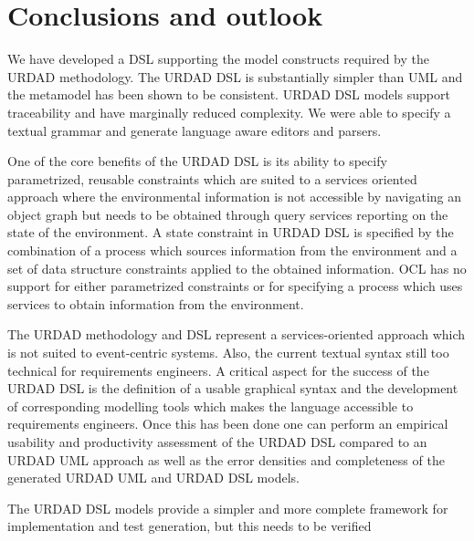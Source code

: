 \section{Conclusions and outlook \label{sec:conclusionsAndOutlook}}

We have developed a DSL supporting the model constructs required by the URDAD methodology. The URDAD DSL is substantially simpler than UML and the metamodel has been shown to be consistent. URDAD DSL models support traceability and have marginally reduced complexity. We were able to specify a textual grammar and generate language aware editors and parsers. 

One of the core benefits of the URDAD DSL is its ability to specify parametrized, reusable constraints which are suited to a services oriented approach where the environmental information is not accessible by navigating an object graph but needs to be obtained through query services reporting on the state of the environment. A state constraint in URDAD DSL is specified by the combination of a process which sources information from the environment and a set of data structure constraints applied to the obtained information. OCL has no support for either parametrized constraints or for specifying a process which uses services to obtain information from the environment.

The URDAD methodology and DSL represent a services-oriented approach which is not suited to event-centric systems. Also, the current textual syntax still too technical for requirements engineers. A critical aspect for the success of the URDAD DSL is the definition of a usable graphical syntax and the development of corresponding modelling tools which makes the language accessible to requirements engineers. Once this has been done one can perform an empirical usability and productivity assessment of the URDAD DSL compared to an URDAD UML approach as well as the error densities and completeness of the generated URDAD UML and URDAD DSL models.

The URDAD DSL models provide a simpler and more complete framework for implementation and test generation, but this needs to be verified
  
